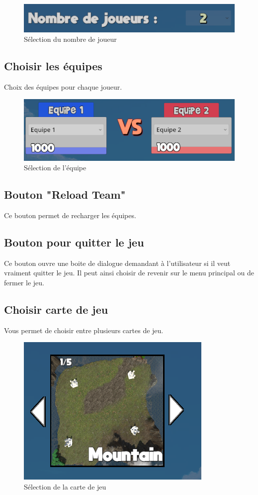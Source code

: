 \documentclass{report}
\begin{document}
\begin{figure}[!h]
	\centering
		\includegraphics[scale=0.60]{Selection_nb_joueurs}
	\caption{Sélection du nombre de joueur}
\end{figure}
\subsection{Choisir les équipes}
Choix des équipes pour chaque joueur.

\begin{figure}[!h]
	\centering
		\includegraphics[scale=0.60]{Selection_Equipes}
	\caption{Sélection de l'équipe}
\end{figure}
\subsection{Bouton "Reload Team"}
Ce bouton permet de recharger les équipes.
\subsection{Bouton pour quitter le jeu}
Ce bouton ouvre une boite de dialogue demandant à l'utilisateur si il veut vraiment quitter le jeu. Il peut ainsi choisir de revenir sur le menu principal ou de fermer le jeu.
\subsection{Choisir carte de jeu}
Vous permet de choisir entre plusieurs cartes de jeu.

\begin{figure}[!h]
	\centering
		\includegraphics[scale=0.80]{Selection_Map}
	\caption{Sélection de la carte de jeu}
\end{figure}
\end{document}
